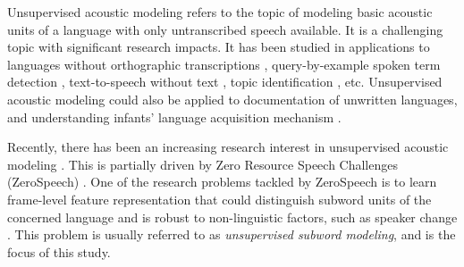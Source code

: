 \documentclass[a4paper]{article}
\begin{document}
Unsupervised acoustic modeling refers to the topic of modeling basic acoustic units of a language with only untranscribed speech available. It is a challenging topic with significant research impacts. It has been studied in applications to languages without orthographic transcriptions \cite{I3EWang}, query-by-example spoken term detection \cite{Chen+2016}, text-to-speech without text \cite{Dunbar2019}, topic identification \cite{SiuGishChanEtAl2014}, etc. Unsupervised acoustic modeling could also be applied to documentation of unwritten languages, and understanding infants' language acquisition mechanism \cite{versteegh2015zero}. 

Recently, there has been an increasing  research interest in unsupervised acoustic modeling \cite{chen2015parallel,heck2017feature,Kamper2017segmental,Tjandra2019,Feng2019combining,Ondel2019Bayesian}. This is partially driven by Zero Resource Speech Challenges (ZeroSpeech) \cite{versteegh2015zero,dunbar2017zero,Dunbar2019}.
One of the research problems tackled by ZeroSpeech is to learn frame-level feature representation that could distinguish subword units of the concerned language and is robust to non-linguistic factors, such as speaker change \cite{versteegh2015zero,dunbar2017zero}. This problem is usually referred to as \textit{unsupervised subword modeling}, and is the focus of this study. 

\end{document}
